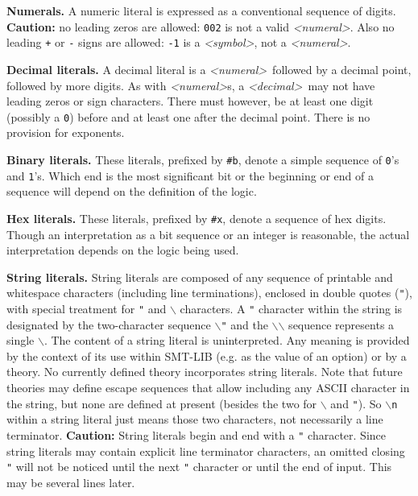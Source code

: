 \documentclass[12pt,oneside]{report}
\newcommand{\sym}{{\it <symbol>}}
\newcommand{\numeral}{{\it <numeral>}}
\newcommand{\decimal}{{\it <decimal>}}
\begin{document}
{\bf Numerals.} A numeric literal is expressed as a conventional sequence of digits. {\bf Caution:} no leading zeros are allowed: {\tt 002} is not a valid \numeral.  Also no leading {\tt +} or {\tt -} signs are allowed: {\tt -1} is a \sym, not a \numeral.

{\bf Decimal literals.} A decimal literal is a \numeral\ followed by a decimal point, followed by more digits. As with \numeral s, a \decimal\ may not have leading zeros or sign characters.  There must however, be at
least one digit (possibly a {\tt 0}) before and at least one after the decimal point. There is no provision for exponents.

{\bf Binary literals.} These literals, prefixed by {\tt \#b}, denote a simple sequence of {\tt 0}'s and {\tt 1}'s.  Which end is the most significant bit or the beginning or end of a sequence will depend on the definition of the logic.

{\bf Hex literals.} These literals, prefixed by {\tt \#x}, denote a sequence of hex digits.  Though an interpretation as a bit
sequence or an integer is reasonable, the actual interpretation depends on the logic being used.

{\bf String literals.} String literals are composed of any sequence of printable and whitespace characters (including line terminations),
enclosed in double quotes ({\tt "}), with special treatment for {\tt "} and {\tt $\backslash$} characters.  A {\tt "} character within the string is designated by the two-character sequence {\tt $\backslash$"}
and the {\tt $\backslash$$\backslash$} sequence represents a single {\tt $\backslash$}.
The content of a string literal is uninterpreted.  Any meaning is provided by the context of its use within SMT-LIB (e.g. as the value of
an option) or by a theory.  No currently defined theory incorporates string literals.  Note that future theories may define escape 
sequences that allow including any ASCII character in the string, but none are defined at present (besides the two for {\tt $\backslash$}
and {\tt "}).  So {\tt $\backslash$n} within a string literal just means those two characters, not necessarily a line terminator.
{\bf Caution:} String literals begin and end with a {\tt "} character.  Since string literals may contain explicit line
terminator characters, an omitted closing {\tt "} will not be noticed until the next {\tt "} character or until the end of input.  This may be several lines later.
\end{document}
